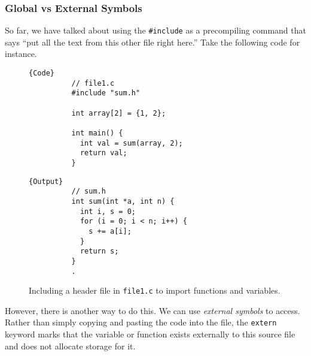     \subsubsection{Global vs External Symbols}

      So far, we have talked about using the \texttt{\#include} as a precompiling command that says ``put all the text from this other file right here.'' Take the following code for instance. 

      \begin{figure}[H]
        \centering 
        \noindent\begin{minipage}{.5\textwidth}
        \begin{lstlisting}[]{Code}
          // file1.c 
          #include "sum.h" 

          int array[2] = {1, 2}; 

          int main() {
            int val = sum(array, 2); 
            return val; 
          }
        \end{lstlisting}
        \end{minipage}
        \hfill
        \begin{minipage}{.49\textwidth}
        \begin{lstlisting}[]{Output}
          // sum.h 
          int sum(int *a, int n) {
            int i, s = 0; 
            for (i = 0; i < n; i++) {
              s += a[i]; 
            }
            return s; 
          }
          .
        \end{lstlisting}
        \end{minipage}
        \caption{Including a header file in \texttt{file1.c} to import functions and variables.}
        \label{fig:include_example}
      \end{figure}

      However, there is another way to do this. We can use \textit{external symbols} to access. Rather than simply copying and pasting the code into the file, the \texttt{extern} keyword marks that the variable or function exists externally to this source file and does not allocate storage for it. 

